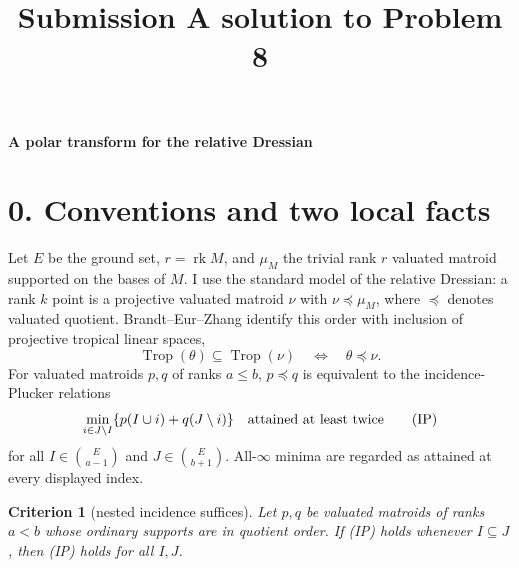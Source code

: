 \documentclass[12pt]{article}
\newcommand{\Trop}{\operatorname{Trop}}
\newcommand{\rk}{\operatorname{rk}}
\newtheorem{criterion}{Criterion}
\begin{document}
\title{Submission A solution to Problem 8}
\date{}
\maketitle

\begin{center}
{\bf A polar transform for the relative Dressian}
\end{center}

\section*{0. Conventions and two local facts}

Let $E$ be the ground set, $r=\rk M$, and $\mu_M$ the trivial rank $r$
valuated matroid supported on the bases of $M$.  I use the standard
model of the relative Dressian: a rank $k$ point is a projective
valuated matroid $\nu$ with $\nu\preceq\mu_M$, where $\preceq$ denotes
valuated quotient.  Brandt--Eur--Zhang \cite{BEZ} identify this order with
inclusion of projective tropical linear spaces,
\[
        \Trop(\theta)\subseteq\Trop(\nu)
        \quad\Longleftrightarrow\quad \theta\preceq\nu .
\]
For valuated matroids $p,q$ of ranks $a\le b$, $p\preceq q$ is
equivalent to the incidence-Plucker relations
\[
 \min_{i\in J\setminus I}\{p(I\cup i)+q(J\setminus i)\}
 \quad\hbox{attained at least twice}                         \tag{IP}
\]
for all $I\in\binom{E}{a-1}$ and $J\in\binom{E}{b+1}$.  All-$\infty$
minima are regarded as attained at every displayed index.

\begin{criterion}[nested incidence suffices]\label{crit:local}
Let $p,q$ be valuated matroids of ranks $a<b$ whose ordinary supports
are in quotient order.  If {\rm (IP)} holds whenever $I\subseteq J$,
then {\rm (IP)} holds for all $I,J$.
\end{criterion}
\end{document}
